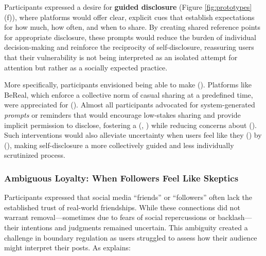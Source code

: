 Participants expressed a desire for \textbf{guided disclosure} (Figure \ref{fig:prototypes}(f)), where platforms would offer clear, explicit cues that establish expectations for how much, how often, and when to share. By creating shared reference points for appropriate disclosure, these prompts would reduce the burden of individual decision-making and reinforce the reciprocity of self-disclosure, reassuring users that their vulnerability is not being interpreted as an isolated attempt for attention but rather as a socially expected practice. 

More specifically, participants envisioned being able to make  (). Platforms like BeReal, which enforce a collective norm of casual sharing at a predefined time, were appreciated for  (). Almost all participants advocated for system-generated \textit{prompts} or reminders that would encourage low-stakes sharing and provide implicit permission to disclose, fostering a  (, ) while reducing concerns about  (). Such interventions would also alleviate uncertainty when users feel like they  () by  (), making self-disclosure a more collectively guided and less individually scrutinized process.



\subsubsection{Ambiguous Loyalty: When Followers Feel Like Skeptics}
\label{section:4-2-2}
Participants expressed that social media ``friends'' or ``followers'' often lack the established trust of real-world friendships. While these connections did not warrant removal---sometimes due to fears of social repercussions or backlash---their intentions and judgments remained uncertain. This ambiguity created a challenge in boundary regulation as users struggled to assess how their audience might interpret their posts. As  explains: 

